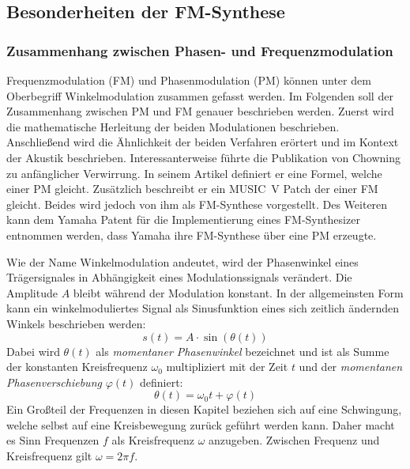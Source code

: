 \subsection{Besonderheiten der FM-Synthese}
\FloatBarrier
\subsubsection{Zusammenhang zwischen Phasen- und Frequenzmodulation}
Frequenzmodulation (FM) und Phasenmodulation (PM) können unter dem Oberbegriff Winkelmodulation zusammen gefasst werden. Im Folgenden soll der Zusammenhang zwischen PM und FM genauer beschrieben werden. Zuerst wird die mathematische Herleitung der beiden Modulationen beschrieben. Anschließend wird die Ähnlichkeit der beiden Verfahren erörtert und im Kontext der Akustik beschrieben.
Interessanterweise führte die Publikation von Chowning zu anfänglicher Verwirrung. In seinem Artikel definiert er eine Formel, welche einer PM gleicht. Zusätzlich beschreibt er ein MUSIC~V Patch der einer FM gleicht. Beides wird jedoch von ihm als FM-Synthese vorgestellt. \cite{rossum1999method} Des Weiteren kann dem Yamaha Patent für die Implementierung eines FM-Synthesizer entnommen werden, dass Yamaha ihre FM-Synthese über eine PM erzeugte. \cite{oya1987electronic} 

Wie der Name Winkelmodulation andeutet, wird der Phasenwinkel eines Trägersignales in Abhängigkeit eines Modulationssignals verändert. Die Amplitude \(A\) bleibt während der Modulation konstant. In der allgemeinsten Form kann ein winkelmoduliertes Signal als Sinusfunktion eines sich zeitlich ändernden Winkels beschrieben werden:
\begin{equation}
s(t)=A\cdot\sin(\theta(t))
\label{eq:signal_basis_funktion}
\end{equation}
Dabei wird \(\theta(t)\) als \textit{momentaner Phasenwinkel} bezeichnet und ist als Summe der konstanten Kreisfrequenz $\omega_0$ multipliziert mit der Zeit $t$ und der \textit{momentanen Phasenverschiebung} $\varphi(t)$ definiert:
\begin{equation*}
\theta(t)=\omega_0t + \varphi(t)
\end{equation*}
Ein Großteil der Frequenzen in diesen Kapitel beziehen sich auf eine Schwingung, welche selbst auf eine Kreisbewegung zurück geführt werden kann. Daher macht es Sinn Frequenzen $f$ als Kreisfrequenz $\omega$ anzugeben. Zwischen Frequenz und Kreisfrequenz gilt $\omega=2\pi f$.



